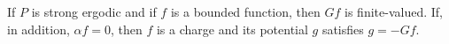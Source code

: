 If $P$ is strong ergodic and if $f$ is a bounded function, then $Gf$ is finite-valued. If, in addition, $\alpha f = 0$, then $f$ is a charge and its potential $g$ satisfies $g = -Gf$.
